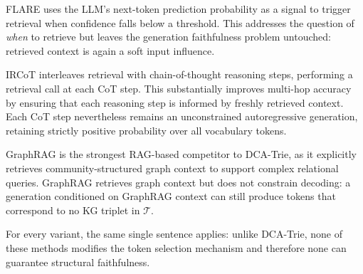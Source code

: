 FLARE \citep{jiang2023flare} uses the LLM's next-token prediction probability as
a signal to trigger retrieval when confidence falls below a threshold. This
addresses the question of \textit{when} to retrieve but leaves the generation
faithfulness problem untouched: retrieved context is again a soft input
influence.

IRCoT \citep{trivedi2022ircot} interleaves retrieval with chain-of-thought
reasoning steps, performing a retrieval call at each CoT step. This substantially
improves multi-hop accuracy by ensuring that each reasoning step is informed by
freshly retrieved context. Each CoT step nevertheless remains an unconstrained
autoregressive generation, retaining strictly positive probability over all
vocabulary tokens.

GraphRAG \citep{edge2024graphrag} is the strongest RAG-based competitor to
DCA-Trie, as it explicitly retrieves community-structured graph context to
support complex relational queries. GraphRAG retrieves graph context but does
not constrain decoding: a generation conditioned on GraphRAG context can still
produce tokens that correspond to no KG triplet in $\mathcal{T}$.

For every variant, the same single sentence applies: unlike DCA-Trie, none of
these methods modifies the token selection mechanism and therefore none can
guarantee structural faithfulness.

